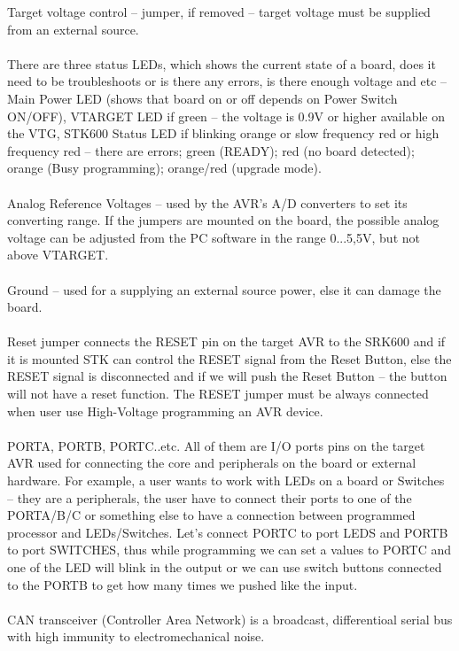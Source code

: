 \documentclass[english]{article}
\begin{document}
Target voltage control – jumper, if removed – target voltage must be supplied from an external source. \\\\
There are three status LEDs, which shows the current state of a board, does it need to be troubleshoots or is there any errors, is there enough voltage and etc – Main Power LED (shows that board on or off depends on Power Switch ON/OFF), VTARGET LED if green – the voltage is 0.9V or higher available on the VTG, STK600 Status LED if blinking orange or slow frequency red or high frequency red – there are errors; green (READY); red (no board detected); orange (Busy programming); orange/red (upgrade mode).\\\\
Analog Reference Voltages – used by the AVR’s A/D converters to set its converting range. If the jumpers are mounted on the board, the possible analog voltage can be adjusted from the PC software in the range 0...5,5V, but not above VTARGET.\\\\
Ground – used for a supplying an external source power, else it can damage the board.\\\\
Reset jumper connects the RESET pin on the target AVR to the SRK600 and if it is mounted STK can control the RESET signal from the Reset Button, else the RESET signal is disconnected and if we will push the Reset Button – the button will not have a reset function. The RESET jumper must be always connected when user use High-Voltage programming an AVR device.\\\\
PORTA, PORTB, PORTC..etc. All of them are I/O ports pins on the target AVR used for connecting the core and peripherals on the board or external hardware. For example, a user wants to work with LEDs on a board or Switches – they are a peripherals, the user have to connect their ports to one of the PORTA/B/C or something else to have a connection between programmed processor and LEDs/Switches. Let’s connect PORTC to port LEDS and PORTB to port SWITCHES, thus while programming we can set a values to PORTC and one of the LED will blink in the output or we can use switch buttons connected to the PORTB to get how many times we pushed like the input. \\\\
CAN transceiver (Controller Area Network) is a broadcast, differentioal serial bus with high immunity to electromechanical noise.\\\\
\end{document}
